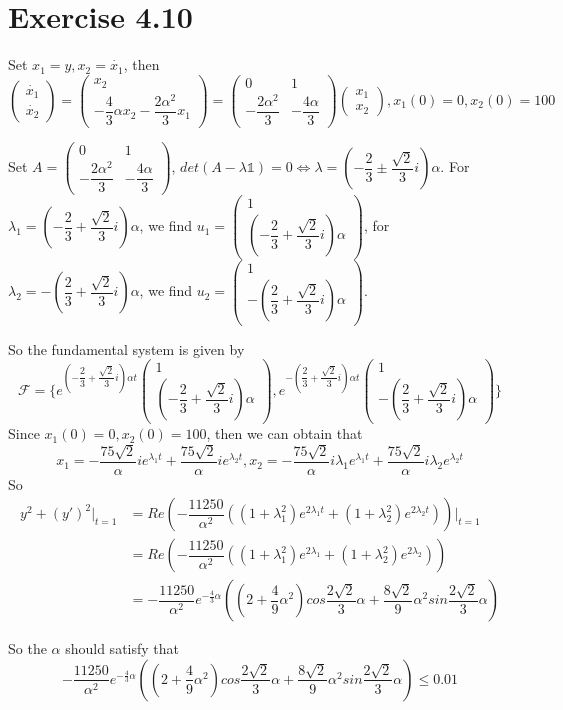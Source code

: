 \documentclass[a4paper,12pt,titlepage]{article}
\begin{document}
\section*{Exercise 4.10}
Set $x_1=y,x_2=\dot{x_1}$, then
$$\begin{pmatrix}
\dot{x_1}\\
\dot{x_2}
\end{pmatrix}=\begin{pmatrix}
x_2\\
-\dfrac{4}{3}\alpha x_2-\dfrac{2\alpha^2}{3}x_1
\end{pmatrix}=\begin{pmatrix}
0&1\\
-\dfrac{2\alpha^2}{3}&-\dfrac{4\alpha}{3}
\end{pmatrix}\begin{pmatrix}
x_1\\
x_2
\end{pmatrix}
,x_1(0)=0,x_2(0)=100$$

Set $A=\begin{pmatrix}
0&1\\
-\dfrac{2\alpha^2}{3}&-\dfrac{4\alpha}{3}
\end{pmatrix}$, $det(A-\lambda\mathds{1})=0\Leftrightarrow \lambda=(-\dfrac{2}{3}\pm\dfrac{\sqrt{2}}{3}i)\alpha$. For $\lambda_1=(-\dfrac{2}{3}+\dfrac{\sqrt{2}}{3}i)\alpha$, we find $u_1=\begin{pmatrix}
1\\
(-\dfrac{2}{3}+\dfrac{\sqrt{2}}{3}i)\alpha
\end{pmatrix}$, for $\lambda_2=-(\dfrac{2}{3}+\dfrac{\sqrt{2}}{3}i)\alpha$, we find $u_2=\begin{pmatrix}
1\\
-(\dfrac{2}{3}+\dfrac{\sqrt{2}}{3}i)\alpha
\end{pmatrix}$.

So the fundamental system is given by
$$\mathscr{F}=\lbrace e^{(-\dfrac{2}{3}+\dfrac{\sqrt{2}}{3}i)\alpha t}\begin{pmatrix}
1\\
(-\dfrac{2}{3}+\dfrac{\sqrt{2}}{3}i)\alpha
\end{pmatrix},e^{-(\dfrac{2}{3}+\dfrac{\sqrt{2}}{3}i)\alpha t}\begin{pmatrix}
1\\
-(\dfrac{2}{3}+\dfrac{\sqrt{2}}{3}i)\alpha
\end{pmatrix}\rbrace$$
Since $x_1(0)=0,x_2(0)=100$, then we can obtain that
$$x_1=-\dfrac{75\sqrt{2}}{\alpha}ie^{\lambda_1t}+\dfrac{75\sqrt{2}}{\alpha}ie^{\lambda_2t},
x_2=-\dfrac{75\sqrt{2}}{\alpha}i\lambda_1 e^{\lambda_1t}+\dfrac{75\sqrt{2}}{\alpha}i\lambda_2 e^{\lambda_2t}$$
So
\begin{align*}
y^2+(y')^2|_{t=1}&=Re(-\dfrac{11250}{\alpha^2}((1+\lambda_1^2)e^{2\lambda_1t}+(1+\lambda_2^2)e^{2\lambda_2t}))|_{t=1}\\
&=Re(-\dfrac{11250}{\alpha^2}((1+\lambda_1^2)e^{2\lambda_1}+(1+\lambda_2^2)e^{2\lambda_2}))\\
&=-\dfrac{11250}{\alpha^2}e^{-\frac{4}{3}\alpha}((2+\dfrac{4}{9}\alpha^2)cos\dfrac{2\sqrt{2}}{3}\alpha+\dfrac{8\sqrt{2}}{9}\alpha^2 sin\dfrac{2\sqrt{2}}{3}\alpha)
\end{align*}

So the $\alpha$ should satisfy that $$-\dfrac{11250}{\alpha^2}e^{-\frac{4}{3}\alpha}((2+\dfrac{4}{9}\alpha^2)cos\dfrac{2\sqrt{2}}{3}\alpha+\dfrac{8\sqrt{2}}{9}\alpha^2 sin\dfrac{2\sqrt{2}}{3}\alpha)\leqslant 0.01$$ 
\end{document}
